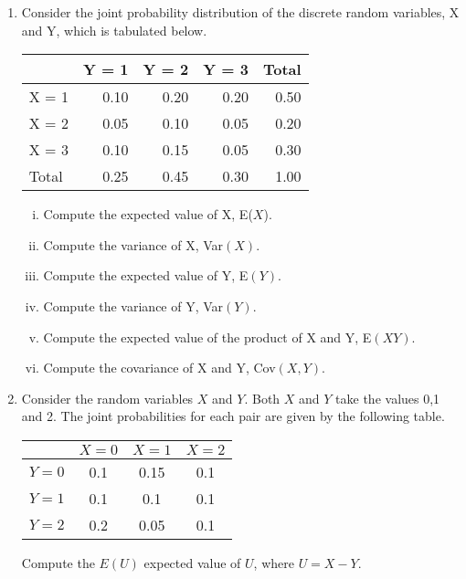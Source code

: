 \documentclass[a4paper,12pt]{article}
\begin{document}
\begin{enumerate}
\smallskip
\item Consider the joint probability distribution of the discrete random variables, X and Y, which is tabulated below.
\begin{table}[ht]
\centering
\begin{tabular}{|l|r|r|r|r|}
\hline
& Y = 1 & Y = 2 & Y = 3 & Total \\ 
\hline \hline 
X = 1 & 0.10 & 0.20 & 0.20 & 0.50 \\ \hline 
X = 2 & 0.05 & 0.10 & 0.05 & 0.20 \\ \hline 
X = 3 & 0.10 & 0.15 & 0.05 & 0.30 \\ \hline 
Total & 0.25 & 0.45 & 0.30 & 1.00 \\ 
\hline
\end{tabular}
\end{table}
\begin{enumerate}[(i)]
\item  Compute the expected value of X, E($X$).

\item  Compute the variance of X, Var$(X)$.

\item  Compute the expected value of Y, E$(Y)$.

\item  Compute the variance of Y, Var$(Y)$.

\item  Compute the expected value of the product of X and Y, E$(XY)$.

\item  Compute the covariance of X and Y, Cov$(X,Y)$.

\end{enumerate}

\item Consider the random variables $X$ and $Y$. Both $X$ and $Y$ take the values 0,1 and 2. 
The joint probabilities for each pair are given by the following table.
\begin{center}
\begin{tabular}{|c|c|c|c|}
\hline  & $X=0$ & $X=1$ & $X=2$ \\ 
\hline $Y=0$ & 0.1 & 0.15 & 0.1 \\ 
\hline $Y=1$ & 0.1 & 0.1 & 0.1 \\ 
\hline $Y=2$ & 0.2 & 0.05 & 0.1 \\ 
\hline 
\end{tabular} 
\end{center}
Compute the $E(U)$ expected value of $U$, where $U=X-Y$.
\end{enumerate}
\end{document}
